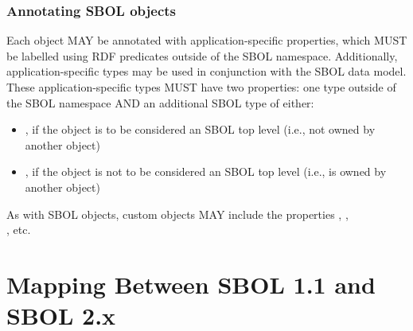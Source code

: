 \subsubsection{Annotating SBOL objects}
\label{sec:qName}
\label{sec:QName}
\label{sec:value}
\label{sec:Annotation}
\label{sec:AnnotationValue}
\label{sec:NestedAnnotations}
\label{sec:nestedQName}
\label{sec:nestedURI}

Each  object MAY be annotated with application-specific properties, which MUST be labelled using RDF predicates outside of the SBOL namespace.  Additionally, application-specific types may be used in conjunction with the SBOL data model. These application-specific types MUST have two  properties: one type outside of the SBOL namespace AND an additional SBOL type of either:

\begin{itemize}
  \item {}, if the object is to be considered an SBOL top level (i.e., not owned by another object)
  \item {}, if the object is not to be considered an SBOL top level (i.e., is owned by another object)
\end{itemize}

As with SBOL  objects, custom  objects MAY include the properties , ,\\ , etc. 

\section{Mapping Between SBOL 1.1 and SBOL 2.x}
\label{sec:mapping}

